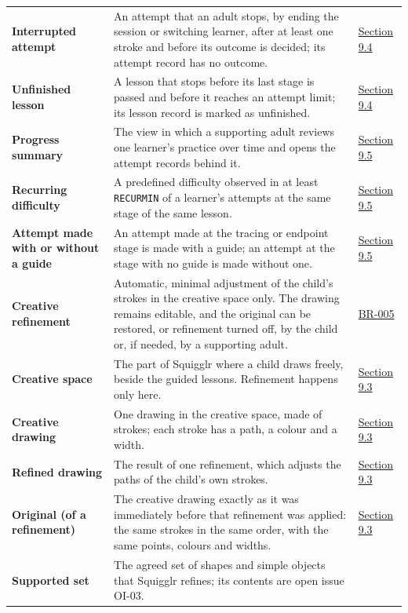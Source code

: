\documentclass[12pt]{article}
\renewcommand{\_}{\textunderscore\allowbreak}%
\begin{document}
{\begin{longtable}{@{}>{\raggedright\arraybackslash}p{}>{\raggedright\arraybackslash}p{}>{\raggedright\arraybackslash}p{}@{}}
\textbf{Interrupted attempt} & An attempt that an adult stops, by ending the
session or switching learner, after at least one stroke and before its outcome
is decided; its attempt record has no outcome. &
\hyperref[sec:fr-records]{Section 9.4}\\
\textbf{Unfinished lesson} & A lesson that stops before its last stage is passed
and before it reaches an attempt limit; its lesson record is marked as
unfinished. & \hyperref[sec:fr-records]{Section 9.4}\\
\textbf{Progress summary} & The view in which a supporting adult reviews one
learner's practice over time and opens the attempt records behind it. &
\hyperref[sec:fr-progress]{Section 9.5}\\
\textbf{Recurring difficulty} & A predefined difficulty observed in at least
\texttt{RECUR\_MIN} of a learner's attempts at the same stage of the same
lesson. & \hyperref[sec:fr-progress]{Section 9.5}\\
\textbf{Attempt made with or without a guide} & An attempt made at the tracing
or endpoint stage is made with a guide; an attempt at the stage with no guide is
made without one. & \hyperref[sec:fr-progress]{Section 9.5}\\
\textbf{Creative refinement} & Automatic, minimal adjustment of the child's
strokes in the creative space only. The drawing remains editable, and the
original can be restored, or refinement turned off, by the child or, if needed,
by a supporting adult. & \hyperref[sec:business-rules]{BR-005}\\
\textbf{Creative space} & The part of Squigglr where a child draws freely,
beside the guided lessons. Refinement happens only here. &
\hyperref[sec:fr-creative]{Section 9.3}\\
\textbf{Creative drawing} & One drawing in the creative space, made of strokes;
each stroke has a path, a colour and a width. &
\hyperref[sec:fr-creative]{Section 9.3}\\
\textbf{Refined drawing} & The result of one refinement, which adjusts the paths
of the child's own strokes. & \hyperref[sec:fr-creative]{Section 9.3}\\
\textbf{Original (of a refinement)} & The creative drawing exactly as it was
immediately before that refinement was applied: the same strokes in the same
order, with the same points, colours and widths. &
\hyperref[sec:fr-creative]{Section 9.3}\\
\textbf{Supported set} & The agreed set of shapes and simple objects that
Squigglr refines; its contents are open issue OI-03. &

\end{longtable}}
\end{document}
